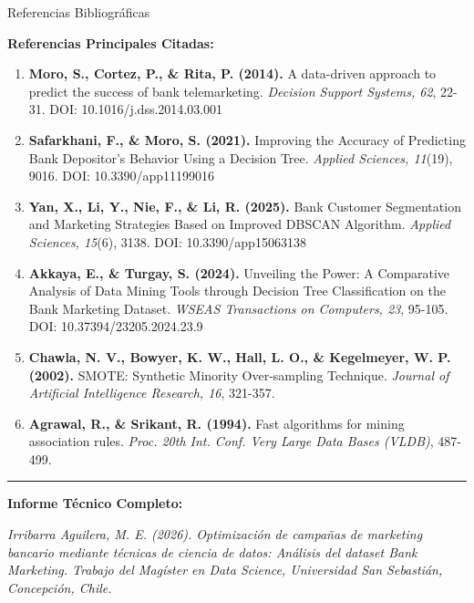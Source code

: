 \documentclass[10pt]{beamer}
\begin{document}
\begin{frame}{Referencias Bibliográficas}
\tiny

\textbf{Referencias Principales Citadas:}

\vspace{0.3cm}
\begin{enumerate}
    \item \textbf{Moro, S., Cortez, P., \& Rita, P. (2014).} A data-driven approach to predict the success of bank telemarketing. \textit{Decision Support Systems, 62}, 22-31. DOI: 10.1016/j.dss.2014.03.001
    
    \vspace{0.15cm}
    \item \textbf{Safarkhani, F., \& Moro, S. (2021).} Improving the Accuracy of Predicting Bank Depositor's Behavior Using a Decision Tree. \textit{Applied Sciences, 11}(19), 9016. DOI: 10.3390/app11199016
    
    \vspace{0.15cm}
    \item \textbf{Yan, X., Li, Y., Nie, F., \& Li, R. (2025).} Bank Customer Segmentation and Marketing Strategies Based on Improved DBSCAN Algorithm. \textit{Applied Sciences, 15}(6), 3138. DOI: 10.3390/app15063138
    
    \vspace{0.15cm}
    \item \textbf{Akkaya, E., \& Turgay, S. (2024).} Unveiling the Power: A Comparative Analysis of Data Mining Tools through Decision Tree Classification on the Bank Marketing Dataset. \textit{WSEAS Transactions on Computers, 23}, 95-105. DOI: 10.37394/23205.2024.23.9
    
    \vspace{0.15cm}
    \item \textbf{Chawla, N. V., Bowyer, K. W., Hall, L. O., \& Kegelmeyer, W. P. (2002).} SMOTE: Synthetic Minority Over-sampling Technique. \textit{Journal of Artificial Intelligence Research, 16}, 321-357.
    
    \vspace{0.15cm}
    \item \textbf{Agrawal, R., \& Srikant, R. (1994).} Fast algorithms for mining association rules. \textit{Proc. 20th Int. Conf. Very Large Data Bases (VLDB)}, 487-499.
\end{enumerate}

\vspace{0.3cm}
\hrule
\vspace{0.2cm}
\tiny
\textbf{Informe Técnico Completo:}

\textit{Irribarra Aguilera, M. E. (2026). Optimización de campañas de marketing bancario mediante técnicas de ciencia de datos: Análisis del dataset Bank Marketing. Trabajo del Magíster en Data Science, Universidad San Sebastián, Concepción, Chile.}
\end{frame}
\end{document}
